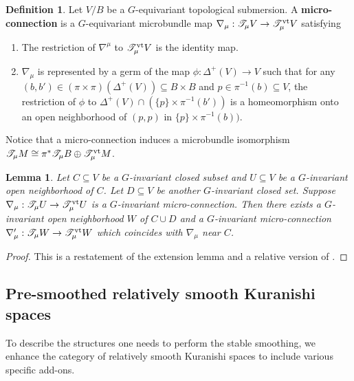 \documentclass[reqno, 10pt]{amsart}
\numberwithin{equation}{section}
\numberwithin{equation}{section}
\renewcommand{\subset}{\subseteq}
\newtheorem{lemma}[thm]{Lemma}
\theoremstyle{definition}
\newtheorem{defn}[thm]{Definition}
\theoremstyle{remark}
\newcommand{\ms}{\mathscr}
\begin{document}
\begin{defn}
Let $V/B$ be a $G$-equivariant topological submersion. A {\bf micro-connection} is a $G$-equivariant microbundle map $\nabla_\mu: {\ms T}_\mu V \to {\ms T}_\mu^{\rm vt} V$ satisfying
\begin{enumerate}
    \item The restriction of $\nabla^\mu$ to ${\ms T}_\mu^{\rm vt} V$ is the identity map.

    \item $\nabla_\mu$ is represented by a germ of the map $\phi: \Delta^+(V) \to V$ such that for any $(b, b') \in (\pi\times \pi)(\Delta^+(V)) \subset B\times B$ and $p \in \pi^{-1}(b) \subset V$, the restriction of $\phi$ to $\Delta^+(V) \cap (\{p\} \times \pi^{-1}(b'))$ is a homeomorphism onto an open neighborhood of $(p, p)$ in $\{p\}\times \pi^{-1}(b))$.
\end{enumerate}
\end{defn}

Notice that a micro-connection induces a microbundle isomorphism ${\ms T}_\mu M \cong \pi^* {\ms T}_\mu B \oplus {\ms T}_\mu^{\rm vt} M$.

\begin{lemma}\label{splitting_lemma}
Let $C \subset V$ be a $G$-invariant closed  subset and $U \subset V$ be a $G$-invariant open neighborhood of $C$. Let $D \subset V$ be another $G$-invariant closed set. Suppose $\nabla_\mu: {\ms T}_\mu U \to {\ms T}_\mu^{\rm vt} U$ is a $G$-invariant micro-connection. Then there exists a $G$-invariant open neighborhood $W$ of $C \cup D$ and a $G$-invariant micro-connection $\nabla_\mu': {\ms T}_\mu W \to {\ms T}_\mu^{\rm vt} W$ which coincides with $\nabla_\mu$ near $C$.
\end{lemma}

\begin{proof}
This is a restatement of the extension lemma \cite[Lemma 4.24]{AMS} and a relative version of \cite[Proposition 4.25]{AMS}.
\end{proof}



\subsection{Pre-smoothed relatively smooth Kuranishi spaces}

To describe the structures one needs to perform the stable smoothing, we enhance the category of relatively smooth Kuranishi spaces to include various specific add-ons.
\end{document}
